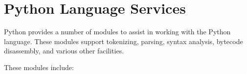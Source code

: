 \chapter{Python Language Services
         \label{language}}

Python provides a number of modules to assist in working with the
Python language.  These modules support tokenizing, parsing, syntax
analysis, bytecode disassembly, and various other facilities.

These modules include:

\localmoduletable
